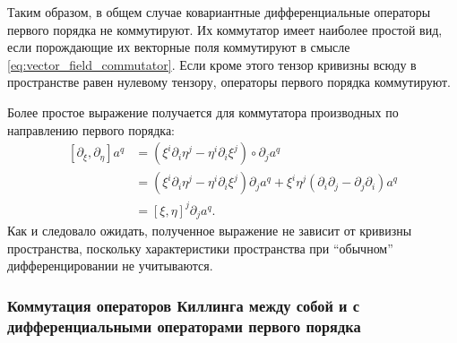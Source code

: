 \documentclass[12pt,a4paper]{article}
\begin{document}
                Таким образом, в общем случае ковариантные дифференциальные операторы первого порядка не коммутируют. Их коммутатор имеет наиболее простой вид, если порождающие их векторные поля коммутируют в смысле \autoref{eq:vector_field_commutator}. Если кроме этого тензор кривизны всюду в пространстве равен нулевому тензору, операторы первого порядка коммутируют.

                Более простое выражение получается для коммутатора производных по направлению первого порядка:
                \begin{equation}\begin{aligned}
                    \left[ \partial_\xi, \partial_\eta \right] a^q
                        &= (\xi^i \partial_i \eta^j - \eta^i \partial_i \xi^j) \circ \partial_j a^q \\
                        &= (\xi^i \partial_i \eta^j - \eta^i \partial_i \xi^j) \partial_j a^q
                            + \xi^i \eta^j (\partial_i \partial_j - \partial_j \partial_i) a^q \\
                        &= \left[ \xi, \eta \right]^j \partial_j a^q .
                \end{aligned}\end{equation}
                Как и следовало ожидать, полученное выражение не зависит от кривизны пространства, поскольку характеристики пространства при \enquote{обычном} дифференцировании не учитываются.


            \subsubsection{Коммутация операторов Киллинга между собой и с дифференциальными операторами первого порядка}
\end{document}
